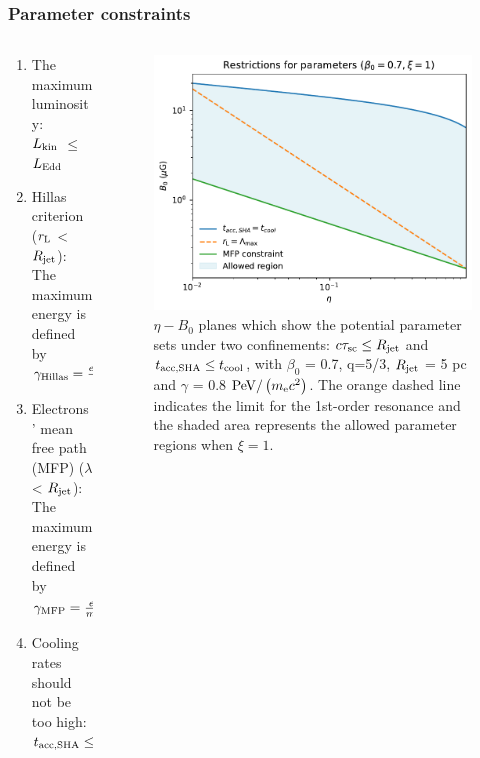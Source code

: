 \documentclass[10pt,aspectratio=169,mathserif]{beamer}
\begin{document}
  \begin{frame}
  \frametitle{Parameter constraints}
  \begin{columns}
  \begin{column}{0.5\textwidth}
	 \begin{enumerate}
	    \item The maximum luminosity: \\
             $L_{\rm kin}$ $\leq$ $L_{\rm Edd}$
             
	    \item Hillas criterion ($r_{\rm L}$ < $R_{\rm jet}$):\\
        The maximum energy is defined by $\gamma_{\rm Hillas} = \frac{eB_0R_{\rm jet}}{m_{\rm e} c^2}\,.$
	    \item Electrons' mean free path (MFP) ($\lambda$ < $R_{\rm jet}$):\\
        The maximum energy is defined by $\gamma_{\rm MFP} = \frac{eB_0}{m_{\rm e} c^2}\left( \xi \Lambda_{\rm max}^{1-q}R_{\rm jet}\right)^{\frac{1}{2-q}}\,.$
	\item Cooling rates should not be too high: $t_{\rm acc, SHA} \leq t_{\rm cool}\,.$  
      \end{enumerate}
  \end{column}
  \begin{column}{0.5\textwidth}
      \begin{figure}
        \centering
        \includegraphics[scale=0.35]{xi=1_beta=0.7.pdf}
        \caption{$\eta-B_0$ planes which show the potential parameter sets under two confinements: $c\tau_{\rm sc} \le R_{\rm jet}$ and $t_{\rm acc,\rm SHA} \le t_{\rm cool}$, with $\beta_0$ = 0.7, q=5/3, $R_{\rm jet}$ = 5 pc and $\gamma$ = 0.8 ${\rm PeV}/\left({m_{\rm e} c^2}\right)$. The orange dashed line indicates the limit for the 1st-order resonance and the shaded area represents the allowed parameter regions when $\xi=1$. 
        \label{fig:confine}}
        \end{figure}
    \end{column}
    \end{columns}
    \end{frame}
\end{document}
